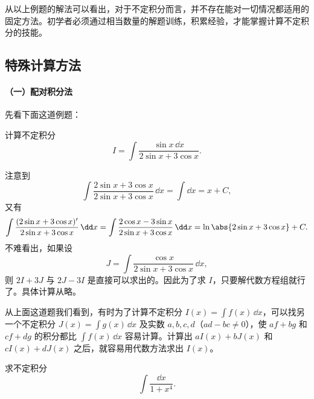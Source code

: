 \begin{xremark}
从以上例题的解法可以看出，对于不定积分而言，并不存在能对一切情况都适用的固定方法。初学者必须通过相当数量的解题训练，积累经验，才能掌握计算不定积分的技能。
\end{xremark}

\subsection{特殊计算方法}

\paragraph{（一）配对积分法}

先看下面这道例题：

\begin{xexample}[9.1.7]
计算不定积分
\[
  I=\int\frac{\sin x\,\dd x}{2\sin x+3\cos x}.
\]
\end{xexample}

\begin{xsolution}
注意到
\[
  \int\frac{2\sin x+3\cos x}{2\sin x+3\cos x}\,\dd x=\int\dd x=x+C,
\]
又有
\[
  \int\frac{(2\sin x+3\cos x)'}{2\sin x+3\cos x}\,\dd x
   =\int\frac{2\cos x-3\sin x}{2\sin x+3\cos x}\,\dd x
   =\ln\abs{2\sin x+3\cos x}+C.
\]
不难看出，如果设
\[
  J=\int\frac{\cos x}{2\sin x+3\cos x}\,\dd x,
\]
则 $2I+3J$ 与 $2J-3I$ 是直接可以求出的。因此为了求 $I$，只要解代数方程组就行了。具体计算从略。
\end{xsolution}

从上面这道题我们看到，有时为了计算不定积分 $I(x)=\int f(x)\,\dd x$，可以找另一个不定积分 $J(x)=\int g(x)\,\dd x$ 及实数 $a,b,c,d$（$ad-bc\ne0$），使 $af+bg$ 和 $cf+dg$ 的积分都比 $\int f(x)\,\dd x$ 容易计算。计算出 $aI(x)+bJ(x)$ 和 $cI(x)+dJ(x)$ 之后，就容易用代数方法求出 $I(x)$。

\begin{xexample}[9.1.8]
求不定积分
\[
  \int\frac{\dd x}{1+x^4}.
\]
\end{xexample}

